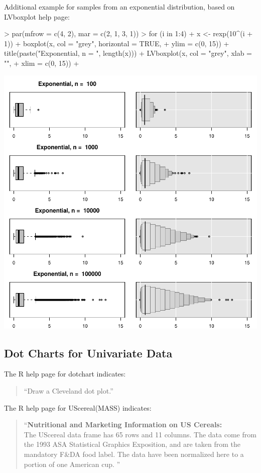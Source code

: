 \documentclass[12pt,letterpaper,final]{article}
\begin{document}
Additional example for samples from an exponential distribution, based on LVboxplot help page:

\begin{Schunk}
\begin{Sinput}
> par(mfrow = c(4, 2), mar = c(2, 1, 3, 1))
> for (i in 1:4) {
+   x <- rexp(10^(i + 1))
+   boxplot(x, col = "grey", horizontal = TRUE,
+           ylim = c(0, 15))
+   title(paste("Exponential, n = ", length(x)))
+   LVboxplot(x, col = "grey", xlab = "",
+             xlim = c(0, 15))
+ }
\end{Sinput}
\end{Schunk}
\includegraphics{lect_main-016}


\newpage


\subsection{Dot Charts for Univariate Data}\label{DotChartsUnivariateData}


The R help page for dotchart indicates:
\begin{quotation}
``Draw a Cleveland dot plot.''
\end{quotation}


The R help page for UScereal(MASS) indicates:
\begin{quotation}
\noindent
``{\bf Nutritional and Marketing Information on US Cereals:} \\[0.2cm]
%
The UScereal data frame has 65 rows and 11 columns. The data come 
from the 1993 ASA Statistical Graphics Exposition, and are taken from 
the mandatory F\&DA food label. The data have been normalized 
here to a portion of one American cup. ''
\end{quotation}
\end{document}
